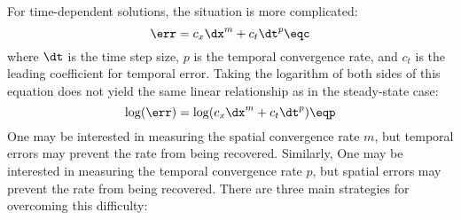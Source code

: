 For time-dependent solutions, the situation is more complicated:
\begin{equation}
  \err = c_{x}\dx^m + c_{t}\dt^p \eqc
\end{equation}
where $\dt$ is the time step size, $p$ is the temporal convergence rate,
and $c_{t}$ is the leading coefficient for temporal error. Taking the
logarithm of both sides of this equation does not yield the same
linear relationship as in the steady-state case:
\begin{equation}\label{eq:logeq}
  \log(\err) = \log(c_{x}\dx^m + c_{t}\dt^p) \eqp
\end{equation}
One may be interested in measuring the spatial convergence rate $m$,
but temporal errors may prevent the rate from being recovered.
Similarly, One may be interested in measuring the temporal convergence rate $p$,
but spatial errors may prevent the rate from being recovered.
There are three main strategies for overcoming this difficulty:
